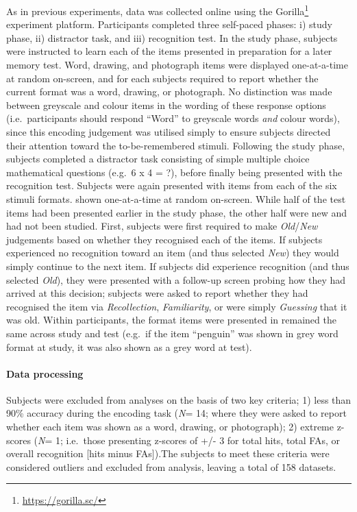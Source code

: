 \documentclass[
  11pt,
]{article}
\begin{document}
\hfill\break As in previous experiments, data was collected online using
the Gorilla\footnote{\url{https://gorilla.sc/}} experiment platform.
Participants completed three self-paced phases: i) study phase, ii)
distractor task, and iii) recognition test. In the study phase, subjects
were instructed to learn each of the items presented in preparation for
a later memory test. Word, drawing, and photograph items were displayed
one-at-a-time at random on-screen, and for each subjects required to
report whether the current format was a word, drawing, or photograph. No
distinction was made between greyscale and colour items in the wording
of these response options (i.e.~participants should respond ``Word'' to
greyscale words \emph{and} colour words), since this encoding judgement
was utilised simply to ensure subjects directed their attention toward
the to-be-remembered stimuli. Following the study phase, subjects
completed a distractor task consisting of simple multiple choice
mathematical questions (e.g.~6 x 4 = ?), before finally being presented
with the recognition test. Subjects were again presented with items from
each of the six stimuli formats. shown one-at-a-time at random
on-screen. While half of the test items had been presented earlier in
the study phase, the other half were new and had not been studied.
First, subjects were first required to make \emph{Old}/\emph{New}
judgements based on whether they recognised each of the items. If
subjects experienced no recognition toward an item (and thus selected
\emph{New}) they would simply continue to the next item. If subjects did
experience recognition (and thus selected \emph{Old}), they were
presented with a follow-up screen probing how they had arrived at this
decision; subjects were asked to report whether they had recognised the
item via \emph{Recollection}, \emph{Familiarity}, or were simply
\emph{Guessing} that it was old. Within participants, the format items
were presented in remained the same across study and test (e.g.~if the
item ``penguin'' was shown in grey word format at study, it was also
shown as a grey word at test).

\hypertarget{data-processing-4}{%
\paragraph{Data processing}\label{data-processing-4}}

\hfill\break Subjects were excluded from analyses on the basis of two
key criteria; 1) less than 90\% accuracy during the encoding task
(\emph{N}= 14; where they were asked to report whether each item was
shown as a word, drawing, or photograph); 2) extreme z-scores (\emph{N}=
1; i.e.~those presenting z-scores of +/- 3 for total hits, total FAs, or
overall recognition {[}hits minus FAs{]}).The subjects to meet these
criteria were considered outliers and excluded from analysis, leaving a
total of 158 datasets.
\end{document}
